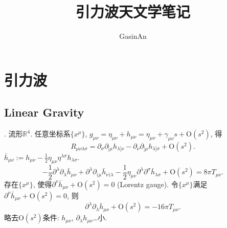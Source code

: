 \documentclass{ctexbook}
\title{引力波天文学笔记}
\author{GasinAn}
\makeatletter
\newcommand{\starttoc}{
    \chapter*{\contentsname}
    \@starttoc{toc}
}
\renewcommand{\tableofcontents}{\twocolumn\starttoc\onecolumn}
\def\p{\partial}
\makeatother
\begin{document}
    \maketitle
    
    \tableofcontents
    \chapter{引力波}
    \section{Linear Gravity}
    \cite{Wald1984}. 流形$\mathbb{R}^{4}$. 任意坐标系$\{x^{\mu}\}$, $g_{\mu\nu}=\eta_{\mu\nu}+h_{\mu\nu}=\eta_{\mu\nu}+\gamma_{\mu\nu}s+\text{O}(s^2)$, 得
    \begin{equation}
        R_{\mu\nu\lambda\sigma}=\p_\sigma\p_{[\mu}h_{\lambda]\nu}-\p_\nu\p_{[\mu}h_{\lambda]\sigma}+\text{O}(s^2).
    \end{equation}
    $\bar{h}_{\mu\nu}:=h_{\mu\nu}-\frac{1}{2}\eta_{\mu\nu}\eta^{\lambda\sigma}h_{\lambda\sigma}$.
    \begin{equation}
        -\frac{1}{2} \partial^{\lambda} \partial_{\lambda} \bar{h}_{\mu \nu}+\partial^{\lambda} \partial_{(\mu} \bar{h}_{\nu) \lambda}-\frac{1}{2} \eta_{\mu \nu} \partial^{\lambda} \partial^{\sigma} \bar{h}_{\lambda \sigma}+\text{O}(s^2)=8 \pi T_{\mu \nu}.
    \end{equation}
    存在$\{x^{\mu}\}$, 使得$\p^{\nu}\bar{h}_{\mu\nu}+\text{O}(s^2)=0$ (Lorentz gauge). 
    令$\{x^{\mu}\}$满足$\p^{\nu}\bar{h}_{\mu\nu}+\text{O}(s^2)=0$, 则
    \begin{equation}
        \p^{\lambda}\p_{\lambda}\bar{h}_{\mu\nu}+\text{O}(s^2)=-16\pi T_{\mu \nu}.
    \end{equation}
    略去$\text{O}(s^2)$条件: $h_{\mu\nu}$, $\p_\lambda h_{\mu\nu}$\dots{}小.
    
    
\end{document}
